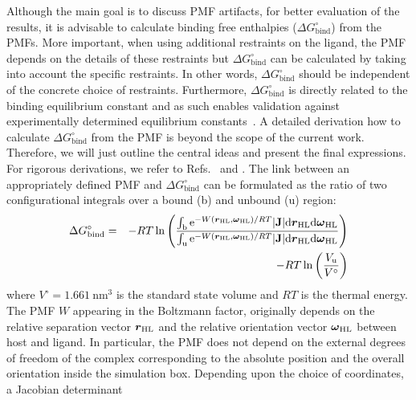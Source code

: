 \documentclass[9pt,lessons,pubversion]{livecoms}
\begin{document}
Although the main goal is to discuss PMF artifacts, for better evaluation of the results, it is advisable to calculate binding free enthalpies ($\Delta G^\circ_\mathrm{bind}$) from the PMFs.
More important, when using additional restraints on the ligand, the PMF depends on the details of these restraints but $\Delta G^\circ_\mathrm{bind}$ can be calculated by taking into account the specific restraints.
In other words, $\Delta G^\circ_\mathrm{bind}$ should be independent of the concrete choice of restraints. 
Furthermore, $\Delta G^\circ_\mathrm{bind}$ is directly related to the binding equilibrium constant and as such enables validation against experimentally determined equilibrium constants~\cite{markthaler2017molecular}.
%
A detailed derivation how to calculate $\Delta G^\circ_\mathrm{bind}$ from the PMF is beyond the scope of the current work.
Therefore, we will just outline the central ideas and present the final expressions. 
For rigorous derivations, we refer to Refs.~ and .
The link between an appropriately defined PMF and $\Delta G^\circ_\mathrm{bind}$ can be formulated as the ratio of two configurational integrals over a bound (b) and unbound (u) region: 
\begin{eqnarray}
	\Delta G^\circ_\mathrm{bind} & = &  
	 -RT \ln\left(
	\frac{\int_\mathrm{b}{\mathrm{e}^{- W(\text{\boldmath $r$}_\mathrm{HL},\text{\boldmath$\omega$}_\mathrm{HL})/RT}  
	\textcolor{black}{\left| \text{\boldmath $\mathrm{J}$} \right|} \mathrm{d}\text{\boldmath $r$}_\mathrm{HL} \mathrm{d}\text{\boldmath$\omega$}_\mathrm{HL}}}
	{\int_\mathrm{u}{\mathrm{e}^{- W(\text{\boldmath $r$}_\mathrm{HL},\text{\boldmath$\omega$}_\mathrm{HL})/RT} \textcolor{black}{\left| \text{\boldmath $\mathrm{J}$} \right|}  
	\mathrm{d}\text{\boldmath $r$}_\mathrm{HL} \mathrm{d}\text{\boldmath$\omega$}_\mathrm{HL}}}
	\right) \nonumber \\ 
	& & -RT \ln\left(\frac{V_\mathrm{u}}{V^\circ}\right)
	\label{eq:DG0_1}
\end{eqnarray}
where $V^\circ = 1.661~\mathrm{nm}^3$ is the standard state volume and $R T$ is the thermal energy.
The PMF $W$ appearing in the Boltzmann factor, originally depends on the relative separation vector $\text{\boldmath $r$}_\mathrm{HL}$ and the relative orientation vector $\text{\boldmath$\omega$}_\mathrm{HL}$ 
between host and ligand. In particular, the PMF does not depend on the external degrees of freedom of the complex corresponding to the absolute position and the overall orientation inside the simulation box.
Depending upon the choice of coordinates, a Jacobian determinant 
\end{document}
